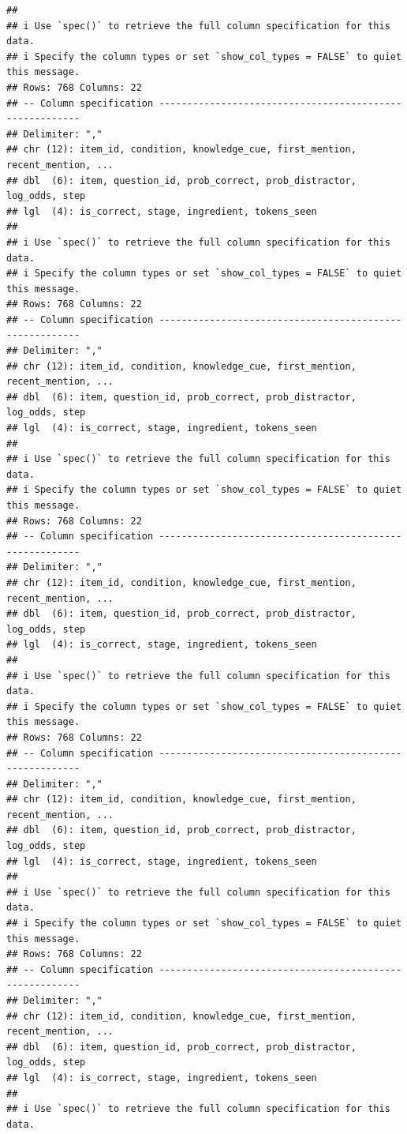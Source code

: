 \documentclass[
]{article}
\begin{document}
\begin{verbatim}
## 
## i Use `spec()` to retrieve the full column specification for this data.
## i Specify the column types or set `show_col_types = FALSE` to quiet this message.
## Rows: 768 Columns: 22
## -- Column specification --------------------------------------------------------
## Delimiter: ","
## chr (12): item_id, condition, knowledge_cue, first_mention, recent_mention, ...
## dbl  (6): item, question_id, prob_correct, prob_distractor, log_odds, step
## lgl  (4): is_correct, stage, ingredient, tokens_seen
## 
## i Use `spec()` to retrieve the full column specification for this data.
## i Specify the column types or set `show_col_types = FALSE` to quiet this message.
## Rows: 768 Columns: 22
## -- Column specification --------------------------------------------------------
## Delimiter: ","
## chr (12): item_id, condition, knowledge_cue, first_mention, recent_mention, ...
## dbl  (6): item, question_id, prob_correct, prob_distractor, log_odds, step
## lgl  (4): is_correct, stage, ingredient, tokens_seen
## 
## i Use `spec()` to retrieve the full column specification for this data.
## i Specify the column types or set `show_col_types = FALSE` to quiet this message.
## Rows: 768 Columns: 22
## -- Column specification --------------------------------------------------------
## Delimiter: ","
## chr (12): item_id, condition, knowledge_cue, first_mention, recent_mention, ...
## dbl  (6): item, question_id, prob_correct, prob_distractor, log_odds, step
## lgl  (4): is_correct, stage, ingredient, tokens_seen
## 
## i Use `spec()` to retrieve the full column specification for this data.
## i Specify the column types or set `show_col_types = FALSE` to quiet this message.
## Rows: 768 Columns: 22
## -- Column specification --------------------------------------------------------
## Delimiter: ","
## chr (12): item_id, condition, knowledge_cue, first_mention, recent_mention, ...
## dbl  (6): item, question_id, prob_correct, prob_distractor, log_odds, step
## lgl  (4): is_correct, stage, ingredient, tokens_seen
## 
## i Use `spec()` to retrieve the full column specification for this data.
## i Specify the column types or set `show_col_types = FALSE` to quiet this message.
## Rows: 768 Columns: 22
## -- Column specification --------------------------------------------------------
## Delimiter: ","
## chr (12): item_id, condition, knowledge_cue, first_mention, recent_mention, ...
## dbl  (6): item, question_id, prob_correct, prob_distractor, log_odds, step
## lgl  (4): is_correct, stage, ingredient, tokens_seen
## 
## i Use `spec()` to retrieve the full column specification for this data.

\end{verbatim}
\end{document}
